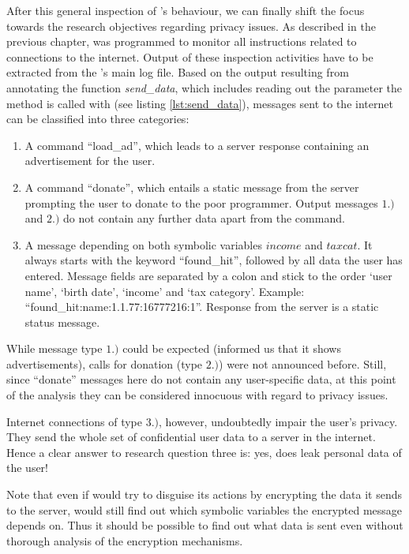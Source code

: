 \medskip

After this general inspection of \app's behaviour, we can finally shift the focus towards the research objectives regarding privacy issues.
As described in the previous chapter, \sse was programmed to monitor all instructions related to connections to the internet.
Output of these inspection activities have to be extracted from the \sse's main log file.
Based on the output resulting from annotating the function \textit{send\_data}, which includes reading out the parameter the method is called with (see listing \ref{lst:send_data}), messages sent to the internet can be classified into three categories:
\begin{enumerate}
\item A command ``load\_ad'', which leads to a server response containing an advertisement for the user.
\item A command ``donate'', which entails a static message from the server prompting the user to donate to the poor programmer. Output messages $1.)$ and $2.)$ do not contain any further data apart from the command.
\item A message depending on both symbolic variables $income$ and $taxcat$.
It always starts with the keyword ``found\_hit'', followed by all data the user has entered.
Message fields are separated by a colon and stick to the order `user name', `birth date', `income' and `tax category'. Example: ``found\_hit:name:1.1.77:16777216:1''.
Response from the server is a static status message.
\end{enumerate}

While message type $1.)$ could be expected (\app informed us that it shows advertisements), calls for donation (type $2.)$) were not announced before.
Still, since ``donate'' messages here do not contain any user-specific data, at this point of the analysis they can be considered innocuous with regard to privacy issues.

Internet connections of type $3.)$, however, undoubtedly impair the user's privacy.
They send the whole set of confidential user data to a server in the internet.
Hence a clear answer to research question three is: yes, \app does leak personal data of the user!

Note that even if \app would try to disguise its actions by encrypting the data it sends to the server, \sse would still find out which symbolic variables the encrypted message depends on.
Thus it should be possible to find out what data is sent even without thorough analysis of the encryption mechanisms.

